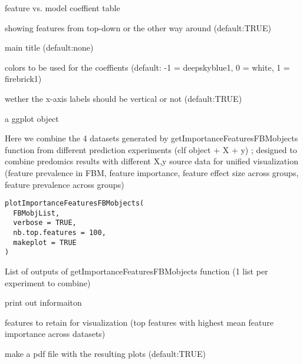 \documentclass[a4paper]{book}
\begin{document}
\begin{Arguments}
\begin{ldescription}
\item[\code{feat.model.coeffs:}] feature vs. model coeffient table

\item[\code{topdown:}] showing features from top-down or the other way around (default:TRUE)

\item[\code{main:}] main title (default:none)

\item[\code{col:}] colors to be used for the coeffients (default: -1 = deepskyblue1, 0 = white, 1 = firebrick1)

\item[\code{vertical.label:}] wether the x-axis labels should be vertical or not (default:TRUE)
\end{ldescription}
\end{Arguments}
%
\begin{Value}
a ggplot object
\end{Value}
%
\begin{Description}
Here we combine the 4 datasets generated by getImportanceFeaturesFBMobjects function from different prediction experiments (clf object + X + y) ; designed to combine predomics results with different X,y source data
for unified visualization (feature prevalence in FBM, feature importance, feature effect size across groups, feature prevalence across groups)
\end{Description}
%
\begin{Usage}
\begin{verbatim}
plotImportanceFeaturesFBMobjects(
  FBMobjList,
  verbose = TRUE,
  nb.top.features = 100,
  makeplot = TRUE
)
\end{verbatim}
\end{Usage}
%
\begin{Arguments}
\begin{ldescription}
\item[\code{FBMobjList}] List of outputs of getImportanceFeaturesFBMobjects function (1 list per experiment to combine)

\item[\code{verbose}] print out informaiton

\item[\code{nb.top.features}] features to retain for visualization (top features with highest mean feature importance across datasets)

\item[\code{makeplot}] make a pdf file with the resulting plots (default:TRUE)
\end{ldescription}
\end{Arguments}
\end{document}
